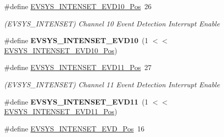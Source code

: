 \begin{DoxyCompactItemize}
\item 
\hypertarget{group___s_a_m_l21___e_v_s_y_s_ga8ad3ca9492ca2eba3baccfd3e15ef3ca}{}\#define \hyperlink{group___s_a_m_l21___e_v_s_y_s_ga8ad3ca9492ca2eba3baccfd3e15ef3ca}{E\+V\+S\+Y\+S\+\_\+\+I\+N\+T\+E\+N\+S\+E\+T\+\_\+\+E\+V\+D10\+\_\+\+Pos}~26\label{group___s_a_m_l21___e_v_s_y_s_ga8ad3ca9492ca2eba3baccfd3e15ef3ca}

\begin{DoxyCompactList}\small\item\em (E\+V\+S\+Y\+S\+\_\+\+I\+N\+T\+E\+N\+S\+E\+T) Channel 10 Event Detection Interrupt Enable \end{DoxyCompactList}\item 
\hypertarget{group___s_a_m_l21___e_v_s_y_s_ga685eed3dec535fc51abcdd06b9131b17}{}\#define {\bfseries E\+V\+S\+Y\+S\+\_\+\+I\+N\+T\+E\+N\+S\+E\+T\+\_\+\+E\+V\+D10}~(1 $<$$<$ \hyperlink{group___s_a_m_l21___e_v_s_y_s_ga8ad3ca9492ca2eba3baccfd3e15ef3ca}{E\+V\+S\+Y\+S\+\_\+\+I\+N\+T\+E\+N\+S\+E\+T\+\_\+\+E\+V\+D10\+\_\+\+Pos})\label{group___s_a_m_l21___e_v_s_y_s_ga685eed3dec535fc51abcdd06b9131b17}

\item 
\hypertarget{group___s_a_m_l21___e_v_s_y_s_ga59d53a19e9866dc43db2a1faaa987ef9}{}\#define \hyperlink{group___s_a_m_l21___e_v_s_y_s_ga59d53a19e9866dc43db2a1faaa987ef9}{E\+V\+S\+Y\+S\+\_\+\+I\+N\+T\+E\+N\+S\+E\+T\+\_\+\+E\+V\+D11\+\_\+\+Pos}~27\label{group___s_a_m_l21___e_v_s_y_s_ga59d53a19e9866dc43db2a1faaa987ef9}

\begin{DoxyCompactList}\small\item\em (E\+V\+S\+Y\+S\+\_\+\+I\+N\+T\+E\+N\+S\+E\+T) Channel 11 Event Detection Interrupt Enable \end{DoxyCompactList}\item 
\hypertarget{group___s_a_m_l21___e_v_s_y_s_ga53ba8a847ac16f4bf88cac4fb1dd2e6f}{}\#define {\bfseries E\+V\+S\+Y\+S\+\_\+\+I\+N\+T\+E\+N\+S\+E\+T\+\_\+\+E\+V\+D11}~(1 $<$$<$ \hyperlink{group___s_a_m_l21___e_v_s_y_s_ga59d53a19e9866dc43db2a1faaa987ef9}{E\+V\+S\+Y\+S\+\_\+\+I\+N\+T\+E\+N\+S\+E\+T\+\_\+\+E\+V\+D11\+\_\+\+Pos})\label{group___s_a_m_l21___e_v_s_y_s_ga53ba8a847ac16f4bf88cac4fb1dd2e6f}

\item 
\hypertarget{group___s_a_m_l21___e_v_s_y_s_ga0b9e0e6564aadc19f81955941877a3a7}{}\#define \hyperlink{group___s_a_m_l21___e_v_s_y_s_ga0b9e0e6564aadc19f81955941877a3a7}{E\+V\+S\+Y\+S\+\_\+\+I\+N\+T\+E\+N\+S\+E\+T\+\_\+\+E\+V\+D\+\_\+\+Pos}~16\label{group___s_a_m_l21___e_v_s_y_s_ga0b9e0e6564aadc19f81955941877a3a7}


\end{DoxyCompactItemize}
